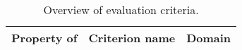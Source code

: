 

\begin{table}[]
\scriptsize
\centering
\caption{Overview of evaluation criteria. \label{tab:evalcriteria}}
\begin{tabular}{| c|c|c|}
\hline  \textbf{Property of}                                                              & \textbf{Criterion name}                                                                           & \textbf{Domain}                                                                             \\ \hline \hline

\hline


\end{tabular}
\end{table}
